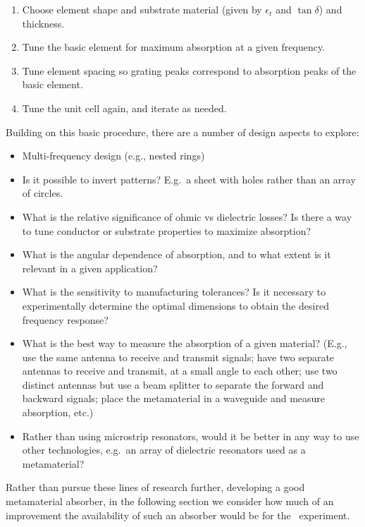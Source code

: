 \begin{enumerate}
   \item Choose element shape and substrate material (given by
      $\epsilon_\text{r}$ and $\tan\delta$) and thickness.
   \item Tune the basic element for maximum absorption at a given frequency.
   \item Tune element spacing so grating peaks correspond to absorption peaks of
      the basic element.
   \item Tune the unit cell again, and iterate as needed.
\end{enumerate}
%
Building on this basic procedure, there are a number of design aspects to
explore:
%
\begin{itemize}
   \item Multi-frequency design (e.g., nested rings)
   \item Is it possible to invert patterns? E.g.\ a sheet with holes rather than an array of circles.
   \item What is the relative significance of ohmic vs dielectric losses? Is
      there a way to tune conductor or substrate properties to maximize
      absorption?
   \item What is the angular dependence of absorption, and to what extent is it
      relevant in a given application?
   \item What is the sensitivity to manufacturing tolerances? Is it necessary
      to experimentally determine the optimal dimensions to obtain the desired
      frequency response?
   \item What is the best way to measure the absorption of a given material?
      (E.g., use the same antenna to receive and transmit signals; have two
      separate antennas to receive and transmit, at a small angle to each other;
      use two distinct antennas but use a beam splitter to separate the forward
      and backward signals; place the metamaterial in a waveguide and measure
      absorption, etc.)
   \item Rather than using microstrip resonators, would it be better in any way
      to use other technologies, e.g.\ an array of dielectric resonators used as
      a metamaterial?
\end{itemize}
%
Rather than pursue these lines of research further, developing a good
metamaterial absorber, in the following section we consider how much of an
improvement the availability of such an absorber would be for the \CENTREX\
experiment.

